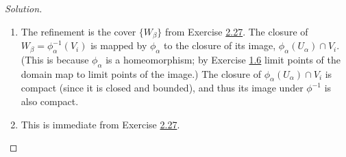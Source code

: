 \begin{proof}[Solution]\leavevmode
\begin{enumerate}[label=(\alph*)]
\item The refinement is the cover \(\{W_\beta\}\) from Exercise \hyperref[exer:2.27]{2.27}. 
The closure of \(W_\beta=\phi^{-1}_\alpha(V_i)\) is mapped by \(\phi_\alpha\) to the closure of its image, \(\phi_\alpha(U_\alpha)\cap V_i\). (This is because  \(\phi_\alpha\) is a homeomorphism; by Exercise \hyperref[exer:1.6]{1.6} limit points of the domain map to limit points of the image.) The closure of \(\phi_\alpha(U_\alpha)\cap V_i\) is compact (since it is closed and bounded), and thus its image under \(\phi^{-1}\) is also compact.

\item This is immediate from Exercise \hyperref[exer:2.27]{2.27}.
\end{enumerate}
\end{proof}
\iffalse
\begin{thing4}{Exercise 2.29}\label{exer:2.29}\leavevmode
Let \(K_1,K_2 K_2\) be non-intersecting compact subsets of a Hausdorff topological space \(M\). Show that there exist a pair of open subsets satisfying \(U_1 \cap U_2=\varnothing\).
\end{thing4}

\begin{proof}[Solution]\leavevmode
Suppose that for every open subsets \(U_1 \supset K_1\) and \(U_2 \supset K_2\) 
\end{proof}
\fi


